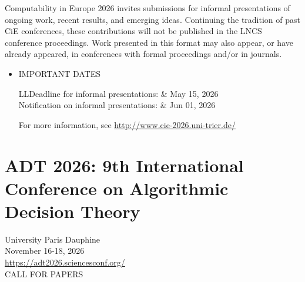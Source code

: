 \documentclass[prodmode,acmtecs]{acmsmall} %
\begin{document}
  Computability in Europe 2026 invites submissions for informal presentations of ongoing work, recent results, and emerging ideas. Continuing the tradition of past CiE conferences, these contributions will not be published in the LNCS conference proceedings. Work presented in this format may also appear, or have already appeared, in conferences with formal proceedings and/or in journals.\\ 
\begin{itemize}\item  IMPORTANT DATES  
 
\begin{tabulary}{\linewidth}{LL}Deadline for informal presentations:  & May 15, 2026 \\
Notification on informal presentations:  & Jun 01, 2026 \\
\end{tabulary}
 
  For more information, see \href{http://www.cie-2026.uni-trier.de/}{http://www.cie-2026.uni-trier.de/} 
 
\end{itemize}\section{ADT 2026: 9th International Conference on Algorithmic Decision Theory}\label{ADT2026}  University Paris Dauphine\\ 
  November 16-18, 2026 \\ 
  \href{https://adt2026.sciencesconf.org/}{https://adt2026.sciencesconf.org/}\\ 
CALL FOR PAPERS 
\end{document}
